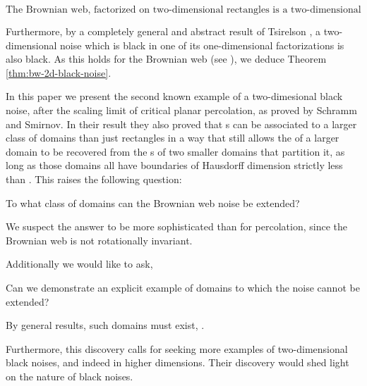 {\[\text{The Brownian web, factorized on two-dimensional
rectangles is a two-dimensional noise.}\]

Furthermore, by a completely general and abstract result
of Tsirelson , a two-dimensional noise which is
black in one of its one-dimensional factorizations is also
black. As this holds for the Brownian web (see ),
we deduce Theorem \ref{thm:bw-2d-black-noise}.


\label{sec:open-problems}

In this paper we present the second known example of a two-dimesional
black noise, after the scaling limit of critical planar percolation,
as proved by Schramm and Smirnov.  In their result they also proved
that \sigfield{}s can be associated to a larger class of domains than
just rectangles in a way that still allows the \sigfield{} of a larger
domain to be recovered from the \sigfield{}s of two smaller domains
that partition it, as long as those domains all have boundaries of
Hausdorff dimension strictly less than .  This raises the following question:

\begin{openproblem}
  To what class of domains can the Brownian web noise be extended?
\end{openproblem}

We suspect the answer to be more sophisticated than for percolation,
since the Brownian web is not rotationally invariant.  

Additionally we would like to ask,

\begin{openproblem}
  Can we demonstrate an explicit example of domains to which the noise
  cannot be extended?
\end{openproblem}

By general results, such domains must exist, .

Furthermore, this discovery calls for seeking more examples of
two-dimensional black noises, and indeed in higher dimensions.  Their
discovery would shed light on the nature of black noises.

}

